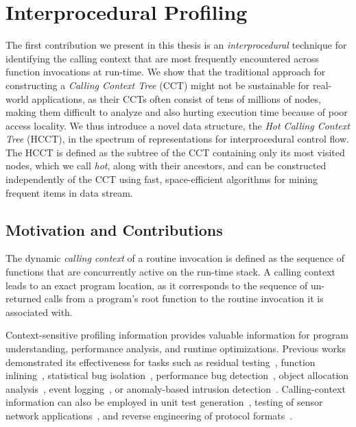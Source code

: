\section{Interprocedural Profiling}

The first contribution we present in this thesis is an {\em interprocedural} technique for identifying the calling context that are most frequently encountered across function invocations at run-time. We show that the traditional approach for constructing a {\em Calling Context Tree} (CCT) might not be sustainable for real-world applications, as their CCTs often consist of tens of millions of nodes, making them difficult to analyze and also hurting execution time because of poor access locality. We thus introduce a novel data structure, the {\em Hot Calling Context Tree} (HCCT), in the spectrum of representations for interprocedural control flow. The HCCT is defined as the subtree of the CCT containing only its most visited nodes, which we call {\em hot}, along with their ancestors, and can be constructed independently of the CCT using fast, space-efficient algorithms for mining frequent items in data stream.

\subsection{Motivation and Contributions}
The dynamic {\em calling context} of a routine invocation is defined as the sequence of functions that are concurrently active on the run-time stack. A calling context leads to an exact program location, as it corresponds to the sequence of un-returned calls from a program’s root function to the routine invocation it is associated with.

Context-sensitive profiling information provides valuable information for program understanding, performance analysis, and runtime optimizations. Previous works demonstrated its effectiveness for tasks such as residual testing~\cite{PavlopoulouY99,Vaswani07}, function inlining~\cite{Chang92}, statistical bug isolation~\cite{Feng03,Liblit03}, performance bug detection~\cite{Nistor13}, object allocation analysis~\cite{Nethercote07}, event logging~\cite{Zhang06}, or anomaly-based intrusion detection~\cite{Bond07}.
Calling-context information can also be employed in unit test generation~\cite{Villazon09}, testing of sensor network applications~\cite{Lai08}, and reverse engineering of protocol formats~\cite{Lin08}.

